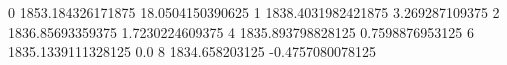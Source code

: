 0 1853.184326171875 18.0504150390625
1 1838.4031982421875 3.269287109375
2 1836.85693359375 1.7230224609375
4 1835.893798828125 0.7598876953125
6 1835.1339111328125 0.0
8 1834.658203125 -0.4757080078125
